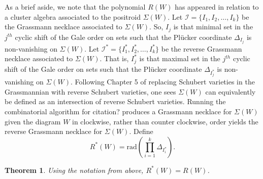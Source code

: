 \documentclass[11pt]{article}
\newtheorem{thm}{Theorem}[section]
\newtheorem{lem}[thm]{Lemma}
\theoremstyle{remark}
\theoremstyle{definition}
\begin{document}
As a brief aside, we note that the polynomial $R(W)$ has appeared in relation to a cluster algebra associated to the positroid $\Sigma(W)$. Let $\mathcal{I} = \{I_1,I_2, \dots, I_k\}$ be the Grassmann necklace associated to $\Sigma(W)$. So, $I_j$ is that minimal set in the $j^{th}$ cyclic shift of the Gale order on sets such that the Pl\"ucker coordinate $\Delta_{I_j}$ is non-vanishing on $\Sigma(W)$. Let $\mathcal{I}^{\ast} = \{I^{\ast}_1, I^{\ast}_2, \dots, I^{\ast}_{k}\}$ be the reverse Grassmann necklace associated to $\Sigma(W)$. That is, $I^{\ast}_j$ is that maximal set in the $j^{th}$ cyclic shift of the Gale order on sets such that the Pl\"ucker coordinate $\Delta_{I^*_j}$ is non-vanishing on $\Sigma(W)$. Following Chapter 5 of \cite{knutsonlamspeyerjuggling} replacing Schubert varieties in the Grassmannian with reverse Schubert varieties, one sees $\Sigma(W)$ can equivalently be defined as an intersection of reverse Schubert varieties. Running the combinatorial algorithm for {\color{red} citation?} produces a Grassmann necklace for $\Sigma(W)$ given the diagram $W$ in clockwise, rather than counter clockwise, order yields the reverse Grassmann necklace for $\Sigma(W)$. Define
%
\begin{displaymath}
R^{\ast}(W) = \mathrm{rad}\left(\prod_{i = 1}^{k} \Delta_{I^{\ast}_i}\right).
\end{displaymath}




\begin{thm}
Using the notation from above, $R^{\ast}(W) = R(W)$.
\end{thm}
\end{document}
